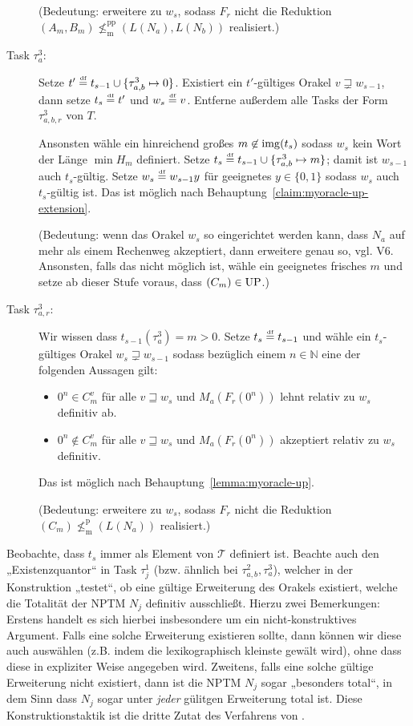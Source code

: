 \begin{description}
        (Bedeutung: erweitere zu $w_s$, sodass $F_r$ nicht die Reduktion $(A_m, B_m)\not\leq_\mathrm{m}^\mathrm{pp} (L(N_a), L(N_b))$ realisiert.) 

    \item[Task $\tau^3_{a}$:] Setze $t'\stackrel{\text{\smash{\tiny df}}}{=} t_{s-1}\cup\{\tau^3_{a,b}\mapsto 0\}$. Existiert ein $t'$-gültiges Orakel $v\sqsupsetneq w_{s-1}$, dann setze $t_s\stackrel{\text{\smash{\tiny df}}}{=} t'$ und $w_s\stackrel{\text{\smash{\tiny df}}}{=} v$. Entferne außerdem alle Tasks der Form $\tau^3_{a,b,r}$ von $T$.

        Ansonsten wähle ein hinreichend großes $m\not\in \operatorname{img}(t_s)$ sodass $w_s$ kein Wort der Länge $\min H_m$ definiert. Setze $t_s\stackrel{\text{\smash{\tiny df}}}{=} t_{s-1}\cup \{ \tau^3_{a,b}\mapsto m \}$; damit ist $w_{s-1}$ auch $t_s$-gültig. Setze $w_s\stackrel{\text{\smash{\tiny df}}}{=} w_{s-1}y$ für geeignetes $y\in\{0,1\}$ sodass $w_s$ auch $t_s$-gültig ist. Das ist möglich nach Behauptung~\ref{claim:myoracle-up-extension}.

        (Bedeutung: wenn das Orakel $w_s$ so eingerichtet werden kann, dass $N_a$ auf mehr als einem Rechenweg akzeptiert, dann erweitere genau so, vgl. V6. Ansonsten, falls das nicht möglich ist, wähle ein geeignetes frisches $m$ und setze ab dieser Stufe voraus, dass $(C_m)\in \mathrm{UP}$.) 

    \item[Task $\tau^3_{a,r}$:] Wir wissen dass $t_{s-1}(\tau^3_{a})=m>0$. Setze $t_s\stackrel{\text{\smash{\tiny df}}}{=} t_{s-1}$ und wähle ein $t_s$-gültiges Orakel $w_s\sqsupsetneq w_{s-1}$ sodass bezüglich einem $n\in\mathbb N$ eine der folgenden Aussagen gilt:
        \begin{itemize}[nosep,endpenalty=10000]
            \item $0^n\in C_m^v$ für alle $v\sqsupseteq w_s$ und $M_a(F_r(0^n))$ lehnt relativ zu $w_s$ definitiv ab.
            \item $0^n\not\in C_m^v$ für alle $v\sqsupseteq w_s$ und $M_a(F_r(0^n))$ akzeptiert relativ zu $w_s$ definitiv.
        \end{itemize} Das ist möglich nach Behauptung~\ref{lemma:myoracle-up}.

        (Bedeutung: erweitere zu $w_s$, sodass $F_r$ nicht die Reduktion $(C_m)\not\leq_\mathrm{m}^\mathrm{p} (L(N_a))$ realisiert.) 
\end{description}

Beobachte, dass $t_s$ immer als Element von $\mathcal T$ definiert ist.
Beachte auch den „Existenzquantor“ in Task $\tau^1_j$ (bzw. ähnlich bei $\tau^2_{a,b}, \tau^3_a$), welcher in der Konstruktion „testet“, ob eine gültige Erweiterung des Orakels existiert, welche die Totalität der NPTM $N_j$ definitiv ausschließt. 
Hierzu zwei Bemerkungen: Erstens handelt es sich hierbei insbesondere um ein nicht-konstruktives Argument. Falls eine solche Erweiterung existieren sollte, dann können wir diese auch auswählen (z.B. indem die lexikographisch kleinste gewält wird), ohne dass diese in expliziter Weise angegeben wird.
Zweitens, falls eine solche gültige Erweiterung nicht existiert, dann ist die NPTM $N_j$ sogar „besonders total“, in dem Sinn dass $N_j$ sogar unter \emph{jeder} gülitgen Erweiterung total ist. 
Diese Konstruktionstaktik ist die dritte Zutat des Verfahrens von \citeauthor{dose_np-completeness_2019}.

